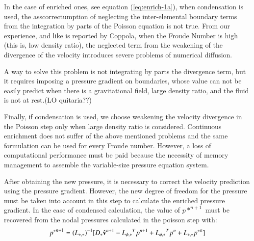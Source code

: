 
In the case of enriched ones, see equation (\ref{eq:enrich-1a}), when condensation is used, the asscorrectumption of neglecting the inter-elemental boundary terms from the integration by parts of the Poisson equation is not true. From our experience, and like is reported by Coppola\cite{Coppola05}, when the Froude Number is high (this is, low density ratio), the neglected term from the weakening of the divergence of the velocity introduces severe problems of numerical diffusion. 

A way to solve this problem is not integrating by parts the divergence term, but it requires imposing a pressure gradient on boundaries, whose value can not be easily predict when there is a gravitational field, large density ratio, and the fluid is not at rest.(LO quitaria??)

Finally, if condensation is used, we choose weakening the velocity divergence in the Poisson step only when large density ratio is considered. Continuous enrichment does not suffer of the above mentioned problems and the same formulation can be used for every
Froude number. However, a loss of computational performance must be paid because the necessity of memory management to assemble the variable-size pressure equation system.


%

After obtaining the new pressure, it is necessary to correct the velocity prediction using the pressure gradient. However, the new degree of freedom for the pressure must be taken into account in this step to calculate the enriched pressure gradient. In the case of condensed calculation, the value of $p*^{n+1}$ must be recovered from the nodal pressures calculated in the poisson step with:
\begin{equation}
  {p^*}^{n+1} = {(L_{*,*})}^{-1}[D_* \hat{\mathbf{v}}^{n+1} - {L_{\phi,*}}^Tp^{n+1} + {L_{\phi,*}}^Tp^{n} + L_{*,*}{p^*}^n]
  \label{recovering}
\end{equation}

